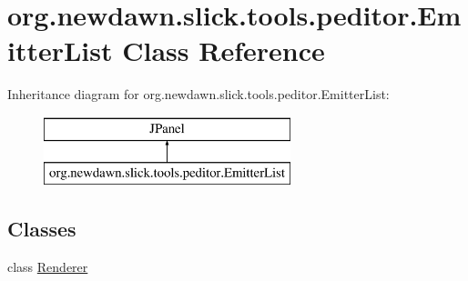 \hypertarget{classorg_1_1newdawn_1_1slick_1_1tools_1_1peditor_1_1_emitter_list}{}\section{org.\+newdawn.\+slick.\+tools.\+peditor.\+Emitter\+List Class Reference}
\label{classorg_1_1newdawn_1_1slick_1_1tools_1_1peditor_1_1_emitter_list}
Inheritance diagram for org.\+newdawn.\+slick.\+tools.\+peditor.\+Emitter\+List\+:\begin{figure}[H]
\begin{center}
\leavevmode
\includegraphics[height=2.000000cm]{classorg_1_1newdawn_1_1slick_1_1tools_1_1peditor_1_1_emitter_list}
\end{center}
\end{figure}
\subsection*{Classes}
\begin{DoxyCompactItemize}
\item 
class \mbox{\hyperlink{classorg_1_1newdawn_1_1slick_1_1tools_1_1peditor_1_1_emitter_list_1_1_renderer}{Renderer}}
\end{DoxyCompactItemize}
